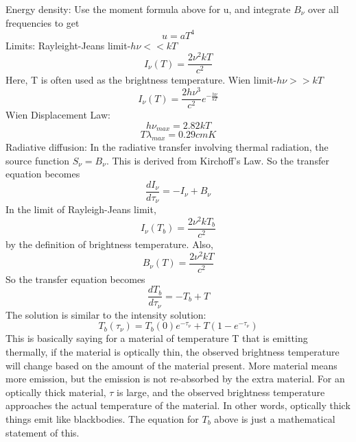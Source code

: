 Energy density:\newline
Use the moment formula above for u, and integrate $B_{\nu}$ over all frequencies to get 
\begin{displaymath}u=aT^4\end{displaymath}
Limits:
Rayleight-Jeans limit-$h\nu<<kT$
\begin{displaymath}I_{\nu}(T)=\frac{2\nu^2kT}{c^2}\end{displaymath}
Here, T is often used as the brightness temperature.
Wien limit-$h\nu>>kT$
\begin{displaymath}I_{\nu}(T)=\frac{2h\nu^3}{c^2}e^{-\frac{h\nu}{kT}}\end{displaymath}
Wien Displacement Law:
\begin{displaymath}h\nu_{max}=2.82kT\end{displaymath}
\begin{displaymath}T\lambda_{max}=0.29cmK\end{displaymath}
Radiative diffusion:
In the radiative transfer involving thermal radiation, the source function $S_{\nu}=B_{\nu}$.  
This is derived from Kirchoff's Law.  
So the transfer equation becomes 
\begin{displaymath}\frac{dI_{\nu}}{d\tau_{\nu}}=-I_{\nu}+B_{\nu}\end{displaymath}
In the limit of Rayleigh-Jeans limit, 
\begin{displaymath}I_{\nu}(T_b)=\frac{2\nu^2kT_b}{c^2}\end{displaymath}
by the definition of brightness temperature.  Also, 
\begin{displaymath}B_{\nu}(T)=\frac{2\nu^2kT}{c^2}\end{displaymath}
So the transfer equation becomes
\begin{displaymath}\frac{dT_b}{d\tau_{\nu}}=-T_b+T\end{displaymath}
The solution is similar to the intensity solution:
\begin{displaymath}T_b(\tau_{\nu})=T_b(0)e^{-\tau_{\nu}}+T(1-e^{-\tau_{\nu}})\end{displaymath}
This is basically saying for a material of temperature T that is emitting thermally, if the 
material is optically thin, the observed brightness temperature will change based on the amount 
of the material present.  More material means more emission, but the emission is not re-absorbed 
by the extra material.  For an optically thick material, $\tau$ is large, and the observed 
brightness temperature approaches the actual temperature of the material.  In other words, 
optically thick things emit like blackbodies.  The equation for $T_b$ above is just a mathematical 
statement of this.


